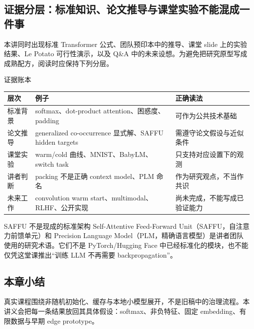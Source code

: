 
\subsection{证据分层：标准知识、论文推导与课堂实验不能混成一件事}

本讲同时出现标准 Transformer 公式、团队预印本中的推导、课堂 slide 上的实验结果、Le Potato 可行性演示，以及 Q\&A 中的未来设想。为避免把研究原型写成成熟配方，阅读时应保持下列分层。

\begin{knowledgebox}{证据账本}
\begin{tabularx}{\textwidth}{L{0.17\textwidth} L{0.29\textwidth} X}
\toprule
层次 & 例子 & 正确读法 \\
\midrule
标准背景 & softmax、dot-product attention、困惑度、padding & 可作为公共技术基础 \\
论文推导 & generalized co-occurrence 显式解、SAFFU hidden targets & 需遵守论文假设与近似条件 \\
课堂实验 & warm/cold 曲线、MNIST、BabyLM、switch task & 只支持对应设置下的观测 \\
讲者判断 & packing 不是正确 context model、PLM 命名 & 作为研究观点，不当作共识 \\
未来工作 & convolution warm start、multimodal、RLHF、公开实现 & 尚未完成，不能写成已验证能力 \\
\bottomrule
\end{tabularx}
\end{knowledgebox}

\begin{warningbox}{SAFFU 不是现成的标准架构}
Self-Attentive Feed-Forward Unit（SAFFU，自注意力前馈单元）和 Precision Language Model（PLM，精确语言模型）是讲者团队使用的研究术语。它们不是 PyTorch/Hugging Face 中已经标准化的模块，也不能仅凭这堂课推出“训练 LLM 不再需要 backpropagation”。
\end{warningbox}

\subsection{本章小结}

真实课程围绕非随机初始化、缓存与本地小模型展开，不是旧稿中的治理流程。本讲义会把每一条结果放回其具体假设：softmax、非负特征、固定 embedding、有限数据与早期 edge prototype。

